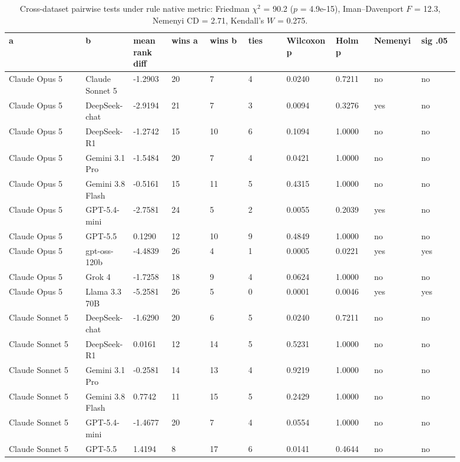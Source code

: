 \begin{landscape}
\tiny
\setlength{\tabcolsep}{3pt}
\begin{longtable}{p{0.162\linewidth}p{0.081\linewidth}p{0.081\linewidth}p{0.081\linewidth}p{0.081\linewidth}p{0.081\linewidth}p{0.081\linewidth}p{0.081\linewidth}p{0.081\linewidth}p{0.081\linewidth}}
\caption{Cross-dataset pairwise tests under rule native metric: Friedman $\chi^2$ = 90.2 ($p$ = 4.9e-15), Iman--Davenport $F$ = 12.3, Nemenyi CD = 2.71, Kendall's $W$ = 0.275.}\label{tab:pairwise_native}\\
\toprule
a & b & mean rank diff & wins a & wins b & ties & Wilcoxon p & Holm p & Nemenyi & sig .05 \\
\midrule
Claude Opus 5 & Claude Sonnet 5 & -1.2903 & 20 & 7 & 4 & 0.0240 & 0.7211 & no & no \\
Claude Opus 5 & DeepSeek-chat & -2.9194 & 21 & 7 & 3 & 0.0094 & 0.3276 & yes & no \\
Claude Opus 5 & DeepSeek-R1 & -1.2742 & 15 & 10 & 6 & 0.1094 & 1.0000 & no & no \\
Claude Opus 5 & Gemini 3.1 Pro & -1.5484 & 20 & 7 & 4 & 0.0421 & 1.0000 & no & no \\
Claude Opus 5 & Gemini 3.8 Flash & -0.5161 & 15 & 11 & 5 & 0.4315 & 1.0000 & no & no \\
Claude Opus 5 & GPT-5.4-mini & -2.7581 & 24 & 5 & 2 & 0.0055 & 0.2039 & yes & no \\
Claude Opus 5 & GPT-5.5 & 0.1290 & 12 & 10 & 9 & 0.4849 & 1.0000 & no & no \\
Claude Opus 5 & gpt-oss-120b & -4.4839 & 26 & 4 & 1 & 0.0005 & 0.0221 & yes & yes \\
Claude Opus 5 & Grok 4 & -1.7258 & 18 & 9 & 4 & 0.0624 & 1.0000 & no & no \\
Claude Opus 5 & Llama 3.3 70B & -5.2581 & 26 & 5 & 0 & 0.0001 & 0.0046 & yes & yes \\
Claude Sonnet 5 & DeepSeek-chat & -1.6290 & 20 & 6 & 5 & 0.0240 & 0.7211 & no & no \\
Claude Sonnet 5 & DeepSeek-R1 & 0.0161 & 12 & 14 & 5 & 0.5231 & 1.0000 & no & no \\
Claude Sonnet 5 & Gemini 3.1 Pro & -0.2581 & 14 & 13 & 4 & 0.9219 & 1.0000 & no & no \\
Claude Sonnet 5 & Gemini 3.8 Flash & 0.7742 & 11 & 15 & 5 & 0.2429 & 1.0000 & no & no \\
Claude Sonnet 5 & GPT-5.4-mini & -1.4677 & 20 & 7 & 4 & 0.0554 & 1.0000 & no & no \\
Claude Sonnet 5 & GPT-5.5 & 1.4194 & 8 & 17 & 6 & 0.0141 & 0.4644 & no & no \\

\end{longtable}
\end{landscape}
